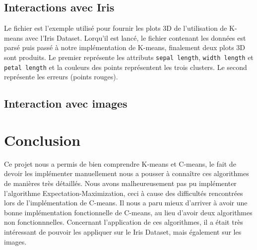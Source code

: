 \documentclass{article}
\begin{document}
    \subsection{Interactions avec Iris}

    Le fichier  est l'exemple utilisé pour fournir les plots 3D de l'utilisation de K-means avec l'Iris Dataset.
    Lorqu'il est lancé, le fichier  contenant les données est parsé puis passé à notre implémentation de K-means,
    finalement deux plots 3D sont produits.
    Le premier représente les attributs \texttt{sepal length}, \texttt{width length} et \texttt{petal length} et la couleurs des points
    représentent les trois clusters.
    Le second représente les erreurs (points rouges).


    \subsection{Interaction avec images}

  \section{Conclusion}

  Ce projet nous a permis de bien comprendre K-means et C-means, le fait de devoir les implémenter
  manuellement nous a pousser à connaître ces algorithmes de manières très détaillés.
  Nous avons malheureusement pas pu implémenter l'algorithme Expectation-Maximization,
  ceci à cause des difficultés rencontrées lors de l'implémentation de C-means.
  Il nous a paru mieux d'arriver à avoir une bonne implémentation fonctionnelle de C-means,
  au lieu d'avoir deux algorithmes non fonctionnnelles.
  Concernant l'application de ces algorithmes,
  il a était très intéressant de pouvoir les appliquer sur le Iris Dataset, mais également sur les images.
\end{document}
